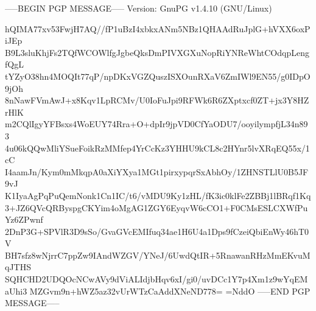 -----BEGIN PGP MESSAGE-----
Version: GnuPG v1.4.10 (GNU/Linux)

hQIMA77xv53FwjH7AQ//fP1uBzI4xbkxANm5NBz1QHAAdRuJplG+hVXX6oxPiJEp
B9L3sluKhjFs2TQfWCOWlfgJgbeQksDmPIVXGXuNopRiYNReWhtCOdqpLengfQgL
tYZyO38hn4MOQIt77qP/npDKxVGZQuszISXOunRXaV6ZmIWl9EN55/g0IDpO9jOh
8nNawFVmAwJ+x8Kqv1LpRCMv/U0IoFuJpi9RFWk6R6ZXptxcf0ZT+jx3Y8HZrHlK
m2CQlIgyYFBsxs4WoEUY74Rra+O+dpIr9jpVD0CfYaODU7/ooyilympfjL34n893
4u06kQQwMliYSueFoikRzMMfep4YrCcKz3YHHU9kCL8c2HYnr5lvXRqEQ55x/1cC
I4aamJn/Kym0mMkqpA0aXiYXya1MGt1pirxypqrSxAbhOy/1ZHNSTLlU0B5JF9vJ
K1IyaAgPqPuQemNonk1Cn1IC/t6/vMDU9Ky1zHL/fK3ic0klFe2ZBBj1lBRqf1Kq
3+JZ6QVcQRByspgCKYim4oMgAG1ZGY6EyqvW6cCO1+F0CMsESLCXWfPuYz6ZPwnf
2DnP3G+SPVlR3D9sSo/GvaGVcEMIfuq34ae1H6U4a1Dps9fCzeiQbiEnWy46hT0V
BH7sfz8wNjrrC7ppZw9IAndWZGV/YNeJ/6UwdQtIR+5RnawanRHzMmEKvuMqJTHS
SQHCHD2UDQOcNCwAVy9dViALIdjbHqv6xI/gi0/uvDCc1Y7p4Xm1z9wYqEMaUhi3
MZGvm9n+hWZ5az32vUrWTzCaAddXNeND778=
=NddO
-----END PGP MESSAGE-----
